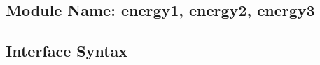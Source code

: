 \documentclass[12pt]{article}
\begin{document}
\subsection{Module Name: energy1, energy2, energy3}





\subsection{Interface Syntax}


\end{document}
